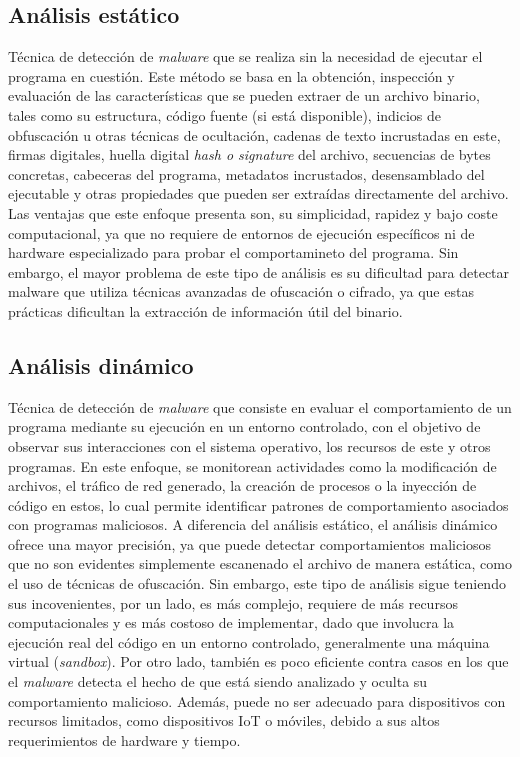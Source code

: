\subsection{Análisis estático}

Técnica de detección de \textit{malware} que se realiza sin la necesidad de ejecutar el programa en cuestión. Este método se basa en la obtención, inspección y evaluación de las características que se pueden extraer de un archivo binario, tales como su estructura, código fuente (si está disponible), indicios de obfuscación u otras técnicas de ocultación, cadenas de texto incrustadas en este, firmas digitales, huella digital \textit{hash o signature} del archivo, secuencias de bytes concretas, cabeceras del programa, metadatos incrustados, desensamblado del ejecutable y otras propiedades que pueden ser extraídas directamente del archivo. Las ventajas que este enfoque presenta son, su simplicidad, rapidez y bajo coste computacional, ya que no requiere de entornos de ejecución específicos ni de hardware especializado para probar el comportamineto del programa. Sin embargo, el mayor problema de este tipo de análisis es su dificultad para detectar malware que utiliza técnicas avanzadas de ofuscación o cifrado, ya que estas prácticas dificultan la extracción de información útil del binario.

\subsection{Análisis dinámico}

Técnica de detección de \textit{malware} que consiste en evaluar el comportamiento de un programa mediante su ejecución en un entorno controlado, con el objetivo de observar sus interacciones con el sistema operativo, los recursos de este y otros programas. En este enfoque, se monitorean actividades como la modificación de archivos, el tráfico de red generado, la creación de procesos o la inyección de código en estos, lo cual permite identificar patrones de comportamiento asociados con programas maliciosos. A diferencia del análisis estático, el análisis dinámico ofrece una mayor precisión, ya que puede detectar comportamientos maliciosos que no son evidentes simplemente escanenado el archivo de manera estática, como el uso de técnicas de ofuscación. Sin embargo, este tipo de análisis sigue teniendo sus incovenientes, por un lado, es más complejo, requiere de más recursos computacionales y es más costoso de implementar, dado que involucra la ejecución real del código en un entorno controlado, generalmente una máquina virtual (\textit{sandbox}). Por otro lado, también es poco eficiente contra casos en los que el \textit{malware} detecta el hecho de que está siendo analizado y oculta su comportamiento malicioso. Además, puede no ser adecuado para dispositivos con recursos limitados, como dispositivos IoT o móviles, debido a sus altos requerimientos de hardware y tiempo.

